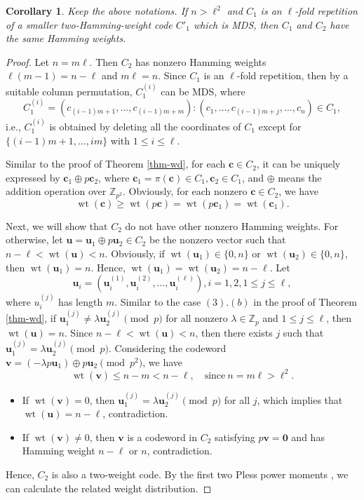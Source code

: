 \documentclass[12pt,reqno]{amsart}
\newtheorem{coro}{Corollary}
\DeclareMathOperator{\wt}{wt}
\renewcommand{\vec}[1]{\boldsymbol{#1}} %
\begin{document}
\begin{coro}
	Keep the above notations.
	If $n > \ell^2$ and $C_1$ is an $\ell$-fold repetition of a smaller two-Hamming-weight code $C'_1$ which is MDS, then $C_1$ and $C_2$ have the same Hamming weights.
\end{coro}
\begin{proof}
	Let $n = m \ell$.
	Then $C_2$ has nonzero Hamming weights $\ell(m-1) = n - \ell$ and $m \ell = n$.
	Since $C_1$ is an $\ell$-fold repetition, then by a suitable column permutation, $C_1^{(i)}$ can be MDS, where
	\[ C_1^{(i)} = (c_{(i-1)m + 1}, \dots, c_{(i-1)m + m}): (c_1, \dots, c_{(i-1)m + j}, \dots, c_{n}) \in C_1, \]
	i.e., $C_1^{(i)}$ is obtained by deleting all the coordinates of $C_1$ except for $\{(i-1)m+1, \dots, im \}$ with $1 \leqslant i \leqslant \ell$.
	
	Similar to the proof of Theorem \ref{thm-wd}, for each $\vec{c} \in C_2$, it can be uniquely expressed by $\vec{c}_1 \oplus p \vec{c}_2$, where $\vec{c}_1 = \pi(\vec{c}) \in C_1, \vec{c}_2 \in C_1$, and $\oplus$ means the addition operation over $\mathbb{Z}_{p^2}$.
	Obviously, for each nonzero $\vec{c} \in C_2$, we have
	\[ \wt(\vec{c}) \geqslant \wt(p \vec{c}) = \wt(p \vec{c}_1) = \wt(\vec{c}_1).  \]
	
	
	Next, we will show that $C_2$ do not have other nonzero Hamming weights.
	For otherwise, let $\vec{u} = \vec{u}_1 \oplus p \vec{u}_2 \in C_2$ be the nonzero vector such that $n - \ell < \wt(\vec{u}) < n$.
	Obviously, if $\wt(\vec{u}_1) \in \{ 0, n \}$ or $\wt(\vec{u}_2) \in \{ 0, n \}$, then $\wt(\vec{u}_1) = n$.
	Hence, $\wt(\vec{u}_1) = \wt(\vec{u}_2) = n - \ell$.
	Let
	\[ \vec{u}_i = (\vec{u}_i^{(1)}, \vec{u}_i^{(2)}, \dots, \vec{u}_i^{(\ell)}), i = 1,2, 1 \leqslant j \leqslant \ell, \]
	where $u_i^{(j)}$ has length $m$.
	Similar to the case $(3).(b)$ in the proof of Theorem \ref{thm-wd}, if $\vec{u}_1^{(j)} \neq \lambda \vec{u}_2^{(j)} \pmod{p}$ for all nonzero $\lambda \in \mathbb{Z}_p$ and $1 \leqslant j \leqslant \ell$, then $\wt(\vec{u}) = n$.
	Since $n - \ell < \wt(\vec{u}) < n$, then there exists $j$ such that $\vec{u}_1^{(j)} = \lambda \vec{u}_2^{(j)} \pmod{p}$.
	Considering the codeword $\vec{v} = (-\lambda p \vec{u}_1) \oplus p \vec{u}_2 \pmod{p^2}$, we have
	\[ \wt(\vec{v}) \leqslant n - m < n - \ell, \quad \text{since}~n = m \ell > \ell^2. \]
	\begin{itemize}
		\item If $\wt(\vec{v}) = 0$, then $\vec{u}_1^{(j)} = \lambda \vec{u}_2^{(j)} \pmod{p}$ for all $j$, which implies that $\wt(\vec{u}) = n - \ell$, contradiction.
		
		\item If $\wt(\vec{v}) \neq 0$, then $\vec{v}$ is a codeword in $C_2$ satisfying $p \vec{v} = \vec{0}$ and has Hamming weight $n-\ell$ or $n$, contradiction.
	\end{itemize}
	Hence, $C_2$ is also a two-weight code.
	By the first two Pless power moments \cite[\S 7.3]{HuffmanPless}, we can calculate the related weight distribution.
\end{proof}
\end{document}
